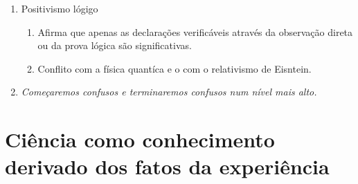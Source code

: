 \documentclass{article}
\begin{document}
\begin{enumerate}
\begin{enumerate}
    \end{enumerate}
    \item Positivismo lógigo
    \begin{enumerate}
        \item Afirma que apenas as declarações verificáveis através da observação direta ou da prova lógica são significativas.
        \item Conflito com a física quantíca e o com o relativismo de Eisntein.
    \end{enumerate}
    \item \textit{Começaremos confusos e terminaremos confusos num nível mais alto.}
\end{enumerate}

\section{Ciência como conhecimento derivado dos fatos da experiência}
\end{document}
